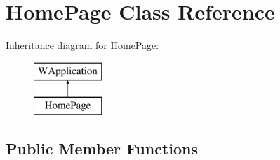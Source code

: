 \hypertarget{class_home_page}{}\section{Home\+Page Class Reference}
\label{class_home_page}
Inheritance diagram for Home\+Page\+:\begin{figure}[H]
\begin{center}
\leavevmode
\includegraphics[height=2.000000cm]{class_home_page}
\end{center}
\end{figure}
\subsection*{Public Member Functions}
